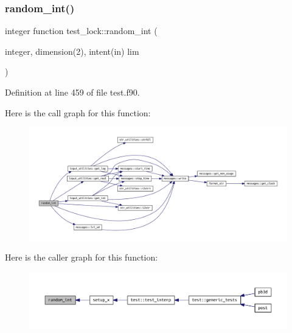 \subsubsection{\texorpdfstring{random\+\_\+int()}{random\_int()}}
{\footnotesize\ttfamily integer function test\+\_\+lock\+::random\+\_\+int (\begin{DoxyParamCaption}\item[{integer, dimension(2), intent(in)}]{lim }\end{DoxyParamCaption})}



Definition at line 459 of file test.\+f90.

Here is the call graph for this function\+:
\nopagebreak
\begin{figure}[H]
\begin{center}
\leavevmode
\includegraphics[width=350pt]{test_8f90_a2da760282029987928d286425c000648_cgraph}
\end{center}
\end{figure}
Here is the caller graph for this function\+:
\nopagebreak
\begin{figure}[H]
\begin{center}
\leavevmode
\includegraphics[width=350pt]{test_8f90_a2da760282029987928d286425c000648_icgraph}
\end{center}
\end{figure}
\mbox{\label{test_8f90_ac59a32c8a4039263eb65c3990732d878}} 
